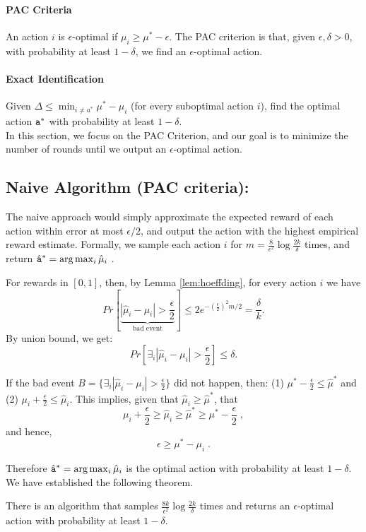 \paragraph{PAC Criteria }
An action $i$ is $\epsilon$-optimal if  $\mu_i\geq \mu^*-\epsilon$. The PAC criterion is
that, given $\epsilon,\delta>0$, with probability at least
$1-\delta$, we find an $\epsilon$-optimal action.

\paragraph{Exact Identification}
Given $\Delta\le\min_{i\neq a^*}\mu^{*}-\mu_{i}$ (for every suboptimal action $i$),
find the optimal action ${\tt a}^{*}$ with probability at least
$1-\delta$.\\

In this section, we  focus on the PAC Criterion, and our goal is to minimize the number of rounds until we output an $\epsilon$-optimal action.

\subsection{Naive Algorithm (PAC criteria):}

The naive approach would simply approximate the expected reward of each action within error at most $\epsilon/2$, and output the action with the highest empirical reward estimate.
Formally, we sample each action $i$ for
$m=\frac{8}{\epsilon^{2}}\log\frac{2k}{\delta}$ times, and return
$\hat{{\tt a}}^*= \arg\max_{i}\hat{\mu}_{i}$ .

For rewards in $[ 0 ,1]$, then, by Lemma \ref{lem:hoeffding}, for
every action $i$ we have
\[
Pr\left[\underbrace{\left|\hat{\mu}_{i}-\mu_{i}\right|>\frac{\epsilon}{2}}_{\text{bad
event}}\right]\le 2
e^{-\left(\frac{\epsilon}{2}\right)^{2}m/2}=\frac{\delta}{k}.
\]
By union bound, we get:
\[
Pr\left[\exists_{i}\left|\hat{\mu}_{i}-\mu_{i}\right|>\frac{\epsilon}{2}\right]\le\delta.
\]

If the bad event
$B=\{\exists_{i}\left|\hat{\mu}_{i}-\mu_{i}\right|>\frac{\epsilon}{2}\}$
did not happen, then: (1)
$\mu^{*}-\frac{\epsilon}{2}\le\hat{\mu}^{*}$ and (2)
$\mu_{i}+\frac{\epsilon}{2}\le\hat{\mu}_{i}$.
%
This implies, given that $\hat{\mu}_i\ge \hat{\mu}^*$, that
\[
\mu_{i}+\frac{\epsilon}{2}\ge\hat{\mu}_{i}\ge\hat{\mu}^{*}\ge\mu^{*}-\frac{\epsilon}{2}\;,
\]
and hence,
\[
\epsilon\ge\mu^{*}-\mu_{i}\;.
\]

Therefore $\hat{{\tt a}}^*= \arg\max_{i}\hat{\mu}_{i}$ is the
optimal action with probability at least $1-\delta$. We have established the following theorem.
\begin{theorem}
    There is an algorithm that samples $\frac{8k}{\epsilon^{2}}\log\frac{2k}{\delta}$ times and returns an $\epsilon$-optimal action with probability at least $1-\delta$.
\end{theorem}


